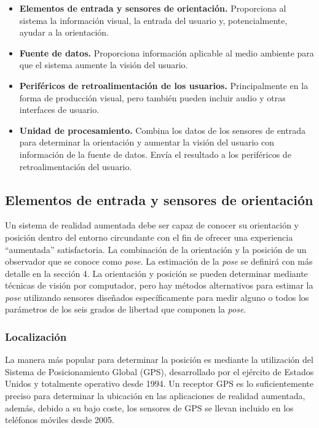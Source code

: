 \begin{itemize}

\item \textbf{Elementos de entrada y sensores de orientación.} Proporciona al sistema la información visual, la entrada del usuario y, potencialmente, ayudar a la orientación.

\item \textbf{Fuente de datos.} Proporciona información aplicable al medio ambiente para que el sistema aumente la visión del usuario.

\item \textbf{Periféricos de retroalimentación de los usuarios.} Principalmente en la forma de producción visual, pero también pueden incluir audio y otras interfaces de usuario.

\item \textbf{Unidad de procesamiento.} Combina los datos de los sensores de entrada para determinar la orientación y aumentar la visión del usuario con información de la fuente de datos. Envía el resultado a los periféricos de retroalimentación del usuario.

\end{itemize}

\subsection{Elementos de entrada y sensores de orientación}
Un sistema de realidad aumentada debe ser capaz de conocer su orientación y posición dentro del entorno circundante con el fin de ofrecer una experiencia ``aumentada'' satisfactoria. La combinación de la orientación y la posición de un observador que se conoce como \emph{pose}. La estimación de la \emph{pose} se definirá con más detalle en la sección 4. La orientación y posición se pueden determinar mediante técnicas de visión por computador, pero hay métodos alternativos para estimar la \emph{pose}  utilizando  sensores diseñados específicamente para medir alguno o todos los parámetros de los seis grados de libertad que componen la \emph{pose}.

\subsubsection{Localización}
La manera más popular para determinar la posición es mediante la utilización del Sistema de Posicionamiento Global (GPS), desarrollado por el ejército de Estados Unidos y totalmente operativo desde 1994. 
Un receptor GPS es lo suficientemente preciso para determinar la ubicación en las aplicaciones de realidad aumentada, además, debido a su bajo coste, los sensores de GPS se llevan incluido en los teléfonos móviles desde 2005.

